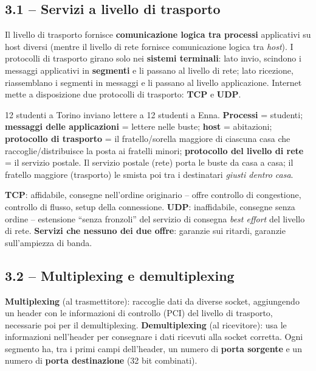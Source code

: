 \documentclass[12pt, a4paper]{article}
\begin{document}
\subsection{3.1 -- Servizi a livello di trasporto}

Il livello di trasporto fornisce \textbf{comunicazione logica tra processi} applicativi su host diversi (mentre il livello di rete fornisce comunicazione logica tra \textit{host}). I protocolli di trasporto girano solo nei \textbf{sistemi terminali}: lato invio, scindono i messaggi applicativi in \textbf{segmenti} e li passano al livello di rete; lato ricezione, riassemblano i segmenti in messaggi e li passano al livello applicazione. Internet mette a disposizione due protocolli di trasporto: \textbf{TCP} e \textbf{UDP}.

\begin{tcolorbox}[colback=teal!5, colframe=teal!60!black, title=\textbf{Analogia con la posta ordinaria}]
12 studenti a Torino inviano lettere a 12 studenti a Enna. \textbf{Processi} = studenti; \textbf{messaggi delle applicazioni} = lettere nelle buste; \textbf{host} = abitazioni; \textbf{protocollo di trasporto} = il fratello/sorella maggiore di ciascuna casa che raccoglie/distribuisce la posta ai fratelli minori; \textbf{protocollo del livello di rete} = il servizio postale. Il servizio postale (rete) porta le buste da casa a casa; il fratello maggiore (trasporto) le smista poi tra i destinatari \textit{giusti dentro casa}.
\end{tcolorbox}

\textbf{TCP}: affidabile, consegne nell'ordine originario -- offre controllo di congestione, controllo di flusso, setup della connessione. \textbf{UDP}: inaffidabile, consegne senza ordine -- estensione ``senza fronzoli'' del servizio di consegna \textit{best effort} del livello di rete. \textbf{Servizi che nessuno dei due offre}: garanzie sui ritardi, garanzie sull'ampiezza di banda.

\subsection{3.2 -- Multiplexing e demultiplexing}

\textbf{Multiplexing} (al trasmettitore): raccoglie dati da diverse socket, aggiungendo un header con le informazioni di controllo (PCI) del livello di trasporto, necessarie poi per il demultiplexing. \textbf{Demultiplexing} (al ricevitore): usa le informazioni nell'header per consegnare i dati ricevuti alla socket corretta. Ogni segmento ha, tra i primi campi dell'header, un numero di \textbf{porta sorgente} e un numero di \textbf{porta destinazione} (32 bit combinati).
\end{document}
